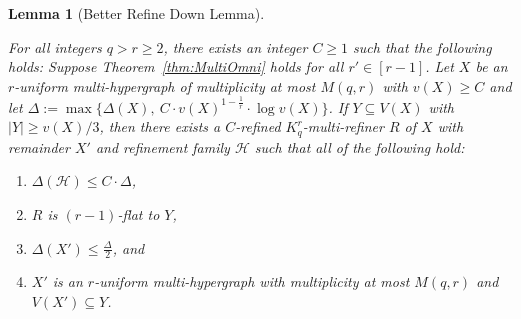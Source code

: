 \documentclass[11pt]{article}
\newcounter{i}
\theoremstyle{plain}
\newtheorem{lem}[thm]{Lemma}
\theoremstyle{plain} %
\theoremstyle{definition}
\begin{document}
\begin{lem}[Better Refine Down Lemma]\label{lem:BetterRefineDown}

For all integers $q > r\ge 2$, there exists an integer $C \ge 1$ such that the following holds: Suppose Theorem~\ref{thm:MultiOmni} holds for all $r'\in [r-1]$.  Let $X$ be an $r$-uniform multi-hypergraph of multiplicity at most $M(q,r)$ with $v(X)\ge C$ and let $\Delta:= \max \{\Delta(X),~C\cdot v(X)^{1-\frac{1}{r}}\cdot \log v(X)\}$. If $Y\subseteq V(X)$ with $|Y|\ge v(X)/3$, then there exists a $C$-refined $K_q^r$-multi-refiner $R$ of $X$ with remainder $X'$ and refinement family $\mathcal{H}$ such that all of the following hold:

\begin{enumerate}
    \item[(1)] $\Delta(\mathcal{H}) \le C \cdot  \Delta$,
    \item[(2)] $R$ is $(r-1)$-flat to $Y$,
    \item[(3)] $\Delta(X')\le \frac{\Delta}{2}$, and
    \item[(4)] $X'$ is an $r$-uniform multi-hypergraph with multiplicity at most $M(q,r)$  and $V(X') \subseteq Y$.
\end{enumerate}      
\end{lem}
\end{document}
